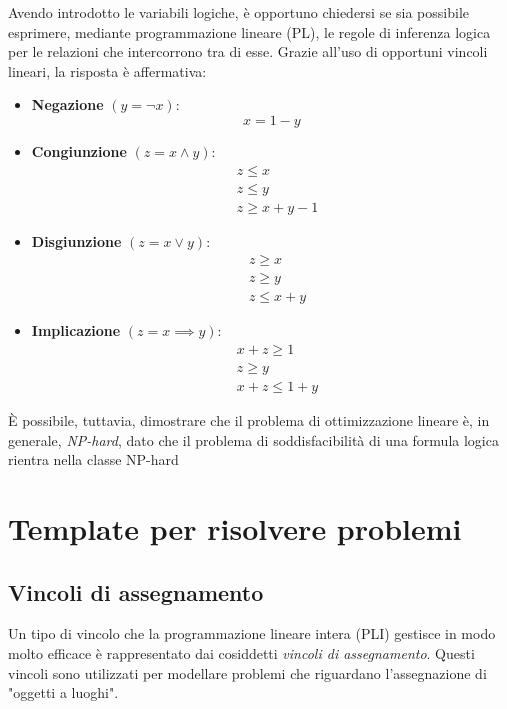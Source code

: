 Avendo introdotto le variabili logiche, è opportuno chiedersi se sia possibile esprimere, mediante programmazione lineare (PL), le regole di inferenza logica per le relazioni che intercorrono tra di esse. Grazie all'uso di opportuni vincoli lineari, la risposta è affermativa:

\begin{itemize}
  \item \textbf{Negazione} \( (y = \neg x) \):
    \[
    x = 1 - y
    \]

  \item \textbf{Congiunzione} \( (z = x \land y) \):
    \[
    \begin{aligned}
      &z \leq x \\
      &z \leq y \\
      &z \geq x + y - 1
    \end{aligned}
    \]

  \item \textbf{Disgiunzione} \( (z = x \lor y) \):
    \[
    \begin{aligned}
      &z \geq x \\
      &z \geq y \\
      &z \leq x + y
    \end{aligned}
    \]

  \item \textbf{Implicazione} \( (z = x \implies y) \):
    \[
    \begin{aligned}
      &x + z \geq 1 \\
      &z \geq y \\
      &x + z \leq 1 + y
    \end{aligned}
    \]
\end{itemize}

È possibile, tuttavia, dimostrare che il problema di ottimizzazione lineare è, in generale, \textit{NP-hard}, dato che il problema di soddisfacibilità di una formula logica rientra nella classe NP-hard
\section{Template per risolvere problemi}

\subsection{Vincoli di assegnamento}
Un tipo di vincolo che la programmazione lineare intera (PLI) gestisce in modo molto efficace è rappresentato dai cosiddetti \textit{vincoli di assegnamento}. Questi vincoli sono utilizzati per modellare problemi che riguardano l'assegnazione di "oggetti a luoghi".


